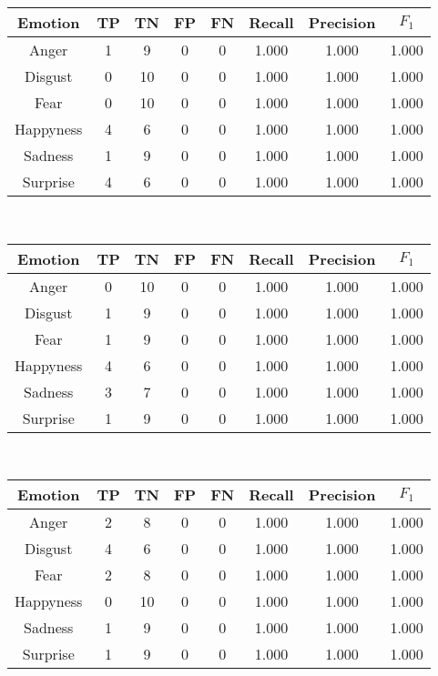 \documentclass[a4paper]{article}
\begin{document}
  \begin{center}
  \begin{tabular}{c|cccc|ccc}
  \hline
    Emotion & TP & TN & FP & FN & Recall & Precision & $F_1$ \\
    \hline
    Anger & 1 & 9 & 0 & 0	 & 1.000 & 1.000 & 1.000\\
Disgust & 0 & 10 & 0 & 0	 & 1.000 & 1.000 & 1.000\\
Fear & 0 & 10 & 0 & 0	 & 1.000 & 1.000 & 1.000\\
Happyness & 4 & 6 & 0 & 0	 & 1.000 & 1.000 & 1.000\\
Sadness & 1 & 9 & 0 & 0	 & 1.000 & 1.000 & 1.000\\
Surprise & 4 & 6 & 0 & 0	 & 1.000 & 1.000 & 1.000\\
  \end{tabular}\\
  
  \begin{tabular}{c|cccc|ccc}
  \hline
    Emotion & TP & TN & FP & FN & Recall & Precision & $F_1$ \\
    \hline
    Anger & 0 & 10 & 0 & 0	 & 1.000 & 1.000 & 1.000\\
Disgust & 1 & 9 & 0 & 0	 & 1.000 & 1.000 & 1.000\\
Fear & 1 & 9 & 0 & 0	 & 1.000 & 1.000 & 1.000\\
Happyness & 4 & 6 & 0 & 0	 & 1.000 & 1.000 & 1.000\\
Sadness & 3 & 7 & 0 & 0	 & 1.000 & 1.000 & 1.000\\
Surprise & 1 & 9 & 0 & 0	 & 1.000 & 1.000 & 1.000\\
  \end{tabular}\\
  
  \begin{tabular}{c|cccc|ccc}
  \hline
    Emotion & TP & TN & FP & FN & Recall & Precision & $F_1$ \\
    \hline
    Anger & 2 & 8 & 0 & 0	 & 1.000 & 1.000 & 1.000\\
Disgust & 4 & 6 & 0 & 0	 & 1.000 & 1.000 & 1.000\\
Fear & 2 & 8 & 0 & 0	 & 1.000 & 1.000 & 1.000\\
Happyness & 0 & 10 & 0 & 0	 & 1.000 & 1.000 & 1.000\\
Sadness & 1 & 9 & 0 & 0	 & 1.000 & 1.000 & 1.000\\
Surprise & 1 & 9 & 0 & 0	 & 1.000 & 1.000 & 1.000\\
  \end{tabular}\\
  

\end{center}
\end{document}
